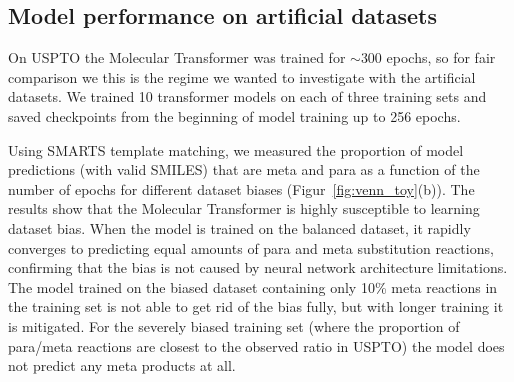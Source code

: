 


\subsection{Model performance on artificial datasets}

On USPTO the Molecular Transformer was trained for $\sim$300 epochs, so for fair comparison we this is the regime we wanted to investigate with the artificial datasets. We trained 10 transformer models on each of three training sets and saved checkpoints from the beginning of model training up to 256 epochs.

Using SMARTS template matching, we measured the proportion of model predictions (with valid SMILES) that are meta and para as a function of the number of epochs for different dataset biases (Figur~\ref{fig:venn_toy}(b)). The results show that the Molecular Transformer is highly susceptible to learning dataset bias. When the model is trained on the balanced dataset, it rapidly converges to predicting equal amounts of para and meta substitution reactions, confirming that the bias is not caused by neural network architecture limitations. The model trained on the biased dataset containing only 10\% meta reactions in the training set is not able to get rid of the bias fully, but with longer training it is mitigated. For the severely biased training set (where the proportion of para/meta reactions are closest to the observed ratio in USPTO) the model does not predict any meta products at all.

